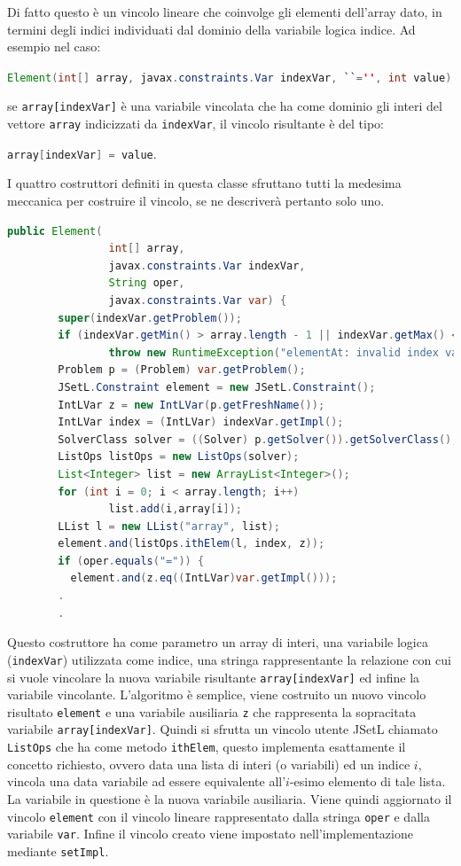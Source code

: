 Di fatto questo è un vincolo lineare che coinvolge gli elementi dell'array
dato, in termini degli indici individuati dal dominio della variabile logica
indice. Ad esempio nel caso:
\begin{center}
\lstinline[language=Java]$Element(int[] array, javax.constraints.Var indexVar, ``='', int value)$
\end{center}
se \texttt{array[indexVar]} è una variabile vincolata che ha come dominio
gli interi del vettore \texttt{array} indicizzati da \texttt{indexVar}, il
vincolo risultante è del tipo:
\begin{center}
\lstinline[language=Java]$array[indexVar] = value$.
\end{center}

I quattro costruttori definiti in questa classe sfruttano tutti la medesima
meccanica per costruire il vincolo, se ne descriverà pertanto solo uno.

\begin{lstlisting}[language = Java,
                   caption = {\texttt{Element} per array di interi.}]
public Element(
                int[] array, 
                javax.constraints.Var indexVar, 
                String oper,
                javax.constraints.Var var) {
        super(indexVar.getProblem());
        if (indexVar.getMin() > array.length - 1 || indexVar.getMax() < 0)
                throw new RuntimeException("elementAt: invalid index variable");
        Problem p = (Problem) var.getProblem();
        JSetL.Constraint element = new JSetL.Constraint();
        IntLVar z = new IntLVar(p.getFreshName());
        IntLVar index = (IntLVar) indexVar.getImpl();
        SolverClass solver = ((Solver) p.getSolver()).getSolverClass();
        ListOps listOps = new ListOps(solver);
        List<Integer> list = new ArrayList<Integer>();
        for (int i = 0; i < array.length; i++)
                list.add(i,array[i]);
        LList l = new LList("array", list);
        element.and(listOps.ithElem(l, index, z));
        if (oper.equals("=")) {
          element.and(z.eq((IntLVar)var.getImpl()));
        .
        .
\end{lstlisting}
Questo costruttore ha come parametro un array di interi, una variabile
logica (\texttt{indexVar}) utilizzata come indice, una stringa rappresentante
la relazione con cui si vuole vincolare la nuova variabile risultante 
\texttt{array[indexVar]} ed infine la variabile vincolante.
L'algoritmo è semplice, viene costruito un nuovo vincolo risultato
\texttt{element} e una variabile ausiliaria \texttt{z} che rappresenta la 
sopracitata variabile \texttt{array[indexVar]}. 
Quindi si sfrutta un vincolo utente JSetL chiamato \texttt{ListOps} che ha come
metodo \texttt{ithElem}, questo implementa esattamente il concetto richiesto,
ovvero data una lista di interi (o variabili) ed un indice $i$, 
vincola una data variabile ad
essere equivalente all'$i$-esimo elemento di tale lista. La variabile in
questione è la nuova variabile ausiliaria. Viene quindi aggiornato il vincolo
\texttt{element} con il vincolo lineare rappresentato dalla stringa 
\texttt{oper} e dalla variabile \texttt{var}. Infine il vincolo creato viene
impostato  nell'implementazione  mediante \texttt{setImpl}.





